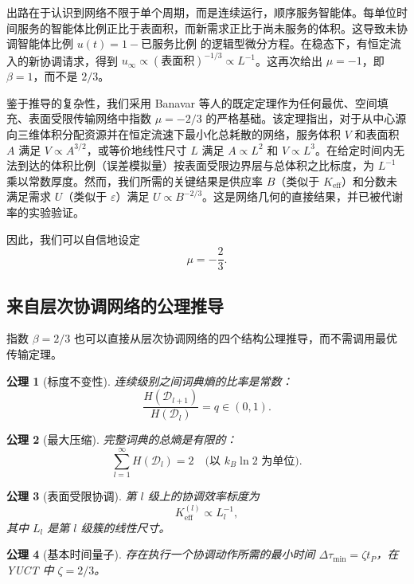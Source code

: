 \documentclass[11pt,a4paper]{article}
\newtheorem{axiom}{公理}[section]
\begin{document}
	出路在于认识到网络不限于单个周期，而是连续运行，顺序服务智能体。每单位时间服务的智能体比例正比于表面积，而新需求正比于尚未服务的体积。这导致未协调智能体比例 \(u(t) = 1 - \text{已服务比例}\) 的逻辑型微分方程。在稳态下，有恒定流入的新协调请求，得到 \(u_{\infty} \propto (\text{表面积})^{-1/3} \propto L^{-1}\)。这再次给出 \(\mu = -1\)，即 \(\beta = 1\)，而不是 \(2/3\)。
	
	鉴于推导的复杂性，我们采用 Banavar 等人的既定定理作为任何最优、空间填充、表面受限传输网络中指数 \(\mu = -2/3\) 的严格基础。该定理指出，对于从中心源向三维体积分配资源并在恒定流速下最小化总耗散的网络，服务体积 \(V\) 和表面积 \(A\) 满足 \(V \propto A^{3/2}\)，或等价地线性尺寸 \(L\) 满足 \(A \propto L^2\) 和 \(V \propto L^3\)。在给定时间内无法到达的体积比例（误差模拟量）按表面受限边界层与总体积之比标度，为 \(L^{-1}\) 乘以常数厚度。然而，我们所需的关键结果是供应率 \(B\)（类似于 \(K_{\mathrm{eff}}\)）和分数未满足需求 \(U\)（类似于 \(\varepsilon\)）满足 \(U \propto B^{-2/3}\)。这是网络几何的直接结果，并已被代谢率的实验验证。
	
	因此，我们可以自信地设定
	\[
	\mu = -\frac{2}{3}. \label{eq:mu}
	\]
	
	\subsection{来自层次协调网络的公理推导}
	\label{subsec:axiomatic-beta}
	
	指数 \(\beta = 2/3\) 也可以直接从层次协调网络的四个结构公理推导，而不需调用最优传输定理。
	
	\begin{axiom}[标度不变性]
		\label{ax:A1}
		连续级别之间词典熵的比率是常数：
		\[
		\frac{H(\mathcal{D}_{l+1})}{H(\mathcal{D}_l)} = q \in (0,1).
		\]
	\end{axiom}
	
	\begin{axiom}[最大压缩]
		\label{ax:A2}
		完整词典的总熵是有限的：
		\[
		\sum_{l=1}^{\infty} H(\mathcal{D}_l) = 2 \quad \text{(以 } k_B\ln 2 \text{ 为单位)}.
		\]
	\end{axiom}
	
	\begin{axiom}[表面受限协调]
		\label{ax:A3}
		第 \(l\) 级上的协调效率标度为
		\[
		K_{\mathrm{eff}}^{(l)} \propto L_l^{-1},
		\]
		其中 \(L_l\) 是第 \(l\) 级簇的线性尺寸。
	\end{axiom}
	
	\begin{axiom}[基本时间量子]
		\label{ax:A4}
		存在执行一个协调动作所需的最小时间 \(\Delta\tau_{\min} = \zeta t_P\)，在 YUCT 中 \(\zeta = 2/3\)。
	\end{axiom}
	
\end{document}

